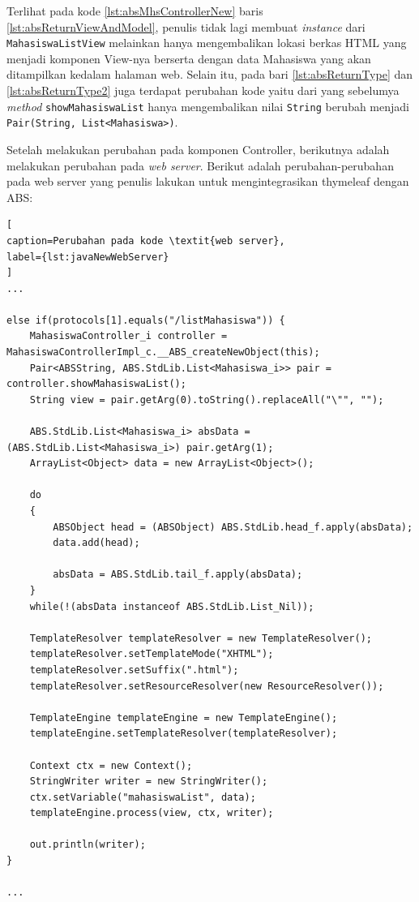 Terlihat pada kode \ref{lst:absMhsControllerNew} baris \ref{lst:absReturnViewAndModel}, penulis tidak lagi membuat \textit{instance} dari \texttt{MahasiswaListView} melainkan hanya mengembalikan lokasi berkas HTML yang menjadi komponen View-nya berserta dengan data Mahasiswa yang akan ditampilkan kedalam halaman web. Selain itu, pada bari \ref{lst:absReturnType} dan \ref{lst:absReturnType2} juga terdapat perubahan kode yaitu dari yang sebelumya \textit{method} \texttt{showMahasiswaList} hanya mengembalikan nilai \texttt{String} berubah menjadi \texttt{Pair(String, List<Mahasiswa>)}.

Setelah melakukan perubahan pada komponen Controller, berikutnya adalah melakukan perubahan pada \textit{web server}. Berikut adalah perubahan-perubahan pada web server yang penulis lakukan untuk mengintegrasikan thymeleaf dengan ABS:

\begin{lstlisting}[
caption=Perubahan pada kode \textit{web server},
label={lst:javaNewWebServer}
]
...

else if(protocols[1].equals("/listMahasiswa")) {
   	MahasiswaController_i controller = MahasiswaControllerImpl_c.__ABS_createNewObject(this);
   	Pair<ABSString, ABS.StdLib.List<Mahasiswa_i>> pair = controller.showMahasiswaList();
   	String view = pair.getArg(0).toString().replaceAll("\"", "");
   	
   	ABS.StdLib.List<Mahasiswa_i> absData = (ABS.StdLib.List<Mahasiswa_i>) pair.getArg(1);
   	ArrayList<Object> data = new ArrayList<Object>();
           		
	do
	{
		ABSObject head = (ABSObject) ABS.StdLib.head_f.apply(absData);
		data.add(head);
		
		absData = ABS.StdLib.tail_f.apply(absData);
	}
	while(!(absData instanceof ABS.StdLib.List_Nil));
	
	TemplateResolver templateResolver = new TemplateResolver();
    templateResolver.setTemplateMode("XHTML");
    templateResolver.setSuffix(".html");
    templateResolver.setResourceResolver(new ResourceResolver());
                
    TemplateEngine templateEngine = new TemplateEngine();
    templateEngine.setTemplateResolver(templateResolver);
                
	Context ctx = new Context();
	StringWriter writer = new StringWriter();
	ctx.setVariable("mahasiswaList", data);
	templateEngine.process(view, ctx, writer);
	
	out.println(writer);
}

...
\end{lstlisting}

